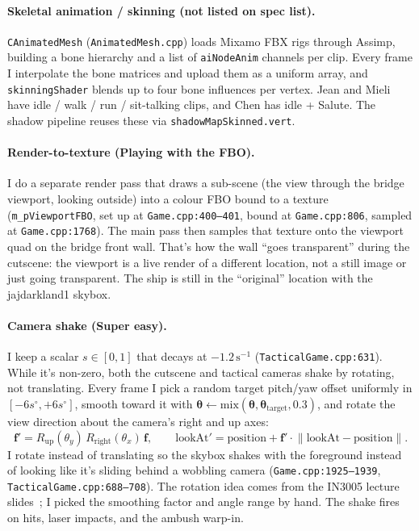 \documentclass[11pt,a4paper]{article}
\begin{document}
\paragraph{Skeletal animation / skinning (not listed on spec list).}
\texttt{CAnimatedMesh} (\texttt{AnimatedMesh.cpp}) loads Mixamo FBX rigs
through Assimp, building a bone hierarchy and a list of \texttt{aiNodeAnim}
channels per clip. Every frame I interpolate the bone matrices and upload
them as a uniform array, and \texttt{skinningShader} blends up to four bone
influences per vertex. Jean and Mieli have idle / walk / run / sit-talking
clips, and Chen has idle + Salute. The shadow pipeline reuses these via
\texttt{shadowMapSkinned.vert}.


\paragraph{Render-to-texture (Playing with the FBO).}
I do a separate render pass that draws a sub-scene (the view through the
bridge viewport, looking outside) into a colour FBO bound to a texture
(\texttt{m\_pViewportFBO}, set up at \texttt{Game.cpp:400--401}, bound at
\texttt{Game.cpp:806}, sampled at \texttt{Game.cpp:1768}). The main pass
then samples that texture onto the viewport quad on the bridge front
wall. That's how the wall ``goes transparent'' during the cutscene: the
viewport is a live render of a different location, not a still image or just going transparent.
The ship is still in the ``original'' location with the jajdarkland1 skybox.


\paragraph{Camera shake (Super easy).}
I keep a scalar $s \in [0, 1]$ that decays at $-1.2\,\mathrm{s}^{-1}$
(\texttt{TacticalGame.cpp:631}). While it's non-zero, both the cutscene
and tactical cameras shake by rotating, not translating. Every frame I
pick a random target pitch/yaw offset uniformly in
$[-6s^\circ, +6s^\circ]$, smooth toward it with
$\boldsymbol{\theta} \leftarrow
\mathrm{mix}(\boldsymbol{\theta}, \boldsymbol{\theta}_\mathrm{target}, 0.3)$,
and rotate the view direction about the camera's right and up axes:
\[
  \mathbf{f}' = R_\mathrm{up}(\theta_y)\,R_\mathrm{right}(\theta_x)\,\mathbf{f},
  \qquad \mathrm{lookAt}' = \mathrm{position} + \mathbf{f}' \cdot \lVert\mathrm{lookAt} - \mathrm{position}\rVert.
\]
I rotate instead of translating so the skybox shakes with the foreground
instead of looking like it's sliding behind a wobbling camera
(\texttt{Game.cpp:1925--1939}, \texttt{TacticalGame.cpp:688--708}). The
rotation idea comes from the IN3005 lecture
slides~\cite{in3005_lectures}; I picked the smoothing factor and angle
range by hand. The shake fires on hits, laser impacts, and the ambush
warp-in.
\end{document}
